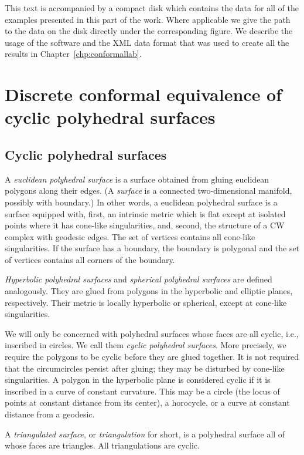 \documentclass[Thesis]{subfiles}
\begin{document}
This text is accompanied by a compact disk which contains the data for all of the examples presented in this part of the work. 
Where applicable we give the path to the data on the disk directly under the corresponding figure.
We describe the usage of the software and the XML data format that was used to create all the results in Chapter~\ref{chp:conformallab}.

\section{Discrete conformal equivalence of cyclic polyhedral surfaces}
\label{sec:basic_definitions}

\subsection{Cyclic polyhedral surfaces }

A \emph{euclidean polyhedral surface} is a surface obtained from
gluing euclidean polygons along their edges. (A \emph{surface} is a
connected two-dimensional manifold, possibly with boundary.)  In other
words, a euclidean polyhedral surface is a surface equipped with,
first, an intrinsic metric which is flat except at isolated points
where it has cone-like singularities, and, second, the structure of a
CW complex with geodesic edges. The set of vertices contains all
cone-like singularities. If the surface has a boundary, the boundary
is polygonal and the set of vertices contains all corners of the
boundary.

\emph{Hyperbolic polyhedral surfaces} and \emph{spherical polyhedral
surfaces} are defined analogously. They are glued from polygons in
the hyperbolic and elliptic planes, respectively. Their metric is
locally hyperbolic or spherical, except at cone-like singularities.

We will only be concerned with polyhedral surfaces whose faces are all
cyclic, i.e., inscribed in circles. We call them \emph{cyclic
polyhedral surfaces}. More precisely, we require the polygons to be
cyclic before they are glued together. It is not required that the
circumcircles persist after gluing; they may be disturbed by cone-like
singularities. A polygon in the hyperbolic plane is considered cyclic
if it is inscribed in a curve of constant curvature. This may be a
circle (the locus of points at constant distance from its center), a
horocycle, or a curve at constant distance from a geodesic.

A \emph{triangulated surface}, or \emph{triangulation} for short, is a
polyhedral surface all of whose faces are triangles.  All
triangulations are cyclic.
\end{document}
